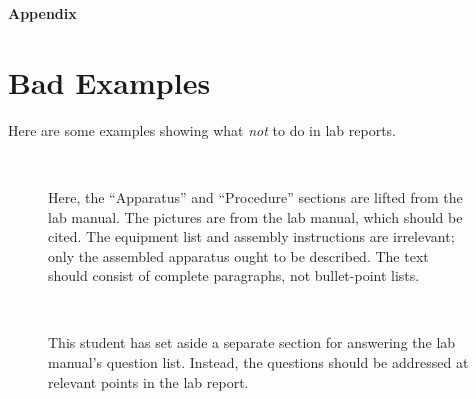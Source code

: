 \documentclass[11pt,a4paper]{article}
\begin{document}
\pagebreak

\begin{center}
  {\LARGE \textbf{Appendix}}
\end{center}

\appendix
\section{Bad Examples}
\label{sec:bad-examples}

Here are some examples showing what \textit{not} to do in lab reports.

\begin{figure}[h]
  \centering
   \\
  \caption{\small Here, the ``Apparatus'' and ``Procedure'' sections
    are lifted from the lab manual.  The pictures are from the lab
    manual, which should be cited.  The equipment list and assembly
    instructions are irrelevant; only the assembled apparatus ought to
    be described.  The text should consist of complete paragraphs, not
    bullet-point lists.  }
\end{figure}

\begin{figure}
  \centering
   \\
  \caption{\small This student has set aside a separate section for
    answering the lab manual's question list.  Instead, the questions
    should be addressed at relevant points in the lab report.}
\end{figure}
\end{document}
